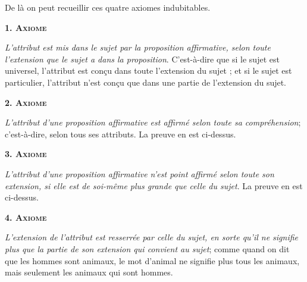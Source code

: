 De là on peut recueillir ces quatre axiomes indubitables.

\begin{center}{\bfseries\scshape 1. Axiome}\end{center}

	\emph{L'attribut est mis dans le sujet par la proposition affirmative, selon toute l'extension que le sujet a dans la proposition}. C'est-à-dire que si le sujet est universel, l'attribut est conçu dans toute l'extension du sujet ; et si le sujet est particulier, l'attribut n'est conçu que dans une partie de l'extension du sujet.

\begin{center}{\bfseries\scshape 2. Axiome}\end{center}

	\emph{L'attribut d'une proposition affirmative est affirmé selon toute sa compréhension}; c'est-à-dire, selon tous ses attributs. La preuve en est ci-dessus.

\begin{center}{\bfseries\scshape 3. Axiome}\end{center}

	\emph{L'attribut d'une proposition affirmative n'est point affirmé selon toute son extension, si elle est de soi-même plus grande que celle du sujet}. La preuve en est ci-dessus.


\bigbreak
\bigbreak
\begin{center}{\bfseries\scshape 4. Axiome}\end{center}

	\emph{L'extension de l'attribut est resserrée par celle du sujet, en sorte qu'il ne signifie plus que la partie de son extension qui convient au sujet}; comme quand on dit que les hommes sont animaux, le mot d'animal ne signifie plus tous les animaux, mais seulement les animaux qui sont hommes.

